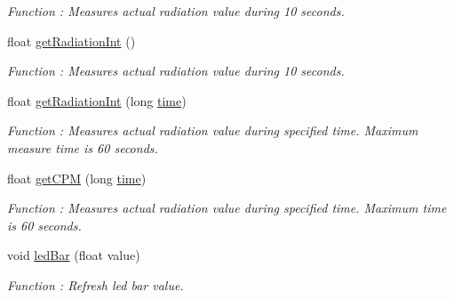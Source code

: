 \begin{DoxyCompactItemize}
\begin{DoxyCompactList}\small\item\em Function \+: Measures actual radiation value during 10 seconds. \end{DoxyCompactList}\item 
float \hyperlink{class_wasp_radiation_board_ad8a1047fbef9840174cd9566bdc8e3f5}{get\+Radiation\+Int} ()\hypertarget{class_wasp_radiation_board_ad8a1047fbef9840174cd9566bdc8e3f5}{}\label{class_wasp_radiation_board_ad8a1047fbef9840174cd9566bdc8e3f5}

\begin{DoxyCompactList}\small\item\em Function \+: Measures actual radiation value during 10 seconds. \end{DoxyCompactList}\item 
float \hyperlink{class_wasp_radiation_board_a1c9a6ed81fb0199c5fb9c2b1adfaa028}{get\+Radiation\+Int} (long \hyperlink{class_wasp_radiation_board_ac423dc8524f911b5e69b1dd1969ab3c0}{time})\hypertarget{class_wasp_radiation_board_a1c9a6ed81fb0199c5fb9c2b1adfaa028}{}\label{class_wasp_radiation_board_a1c9a6ed81fb0199c5fb9c2b1adfaa028}

\begin{DoxyCompactList}\small\item\em Function \+: Measures actual radiation value during specified time. Maximum measure time is 60 seconds. \end{DoxyCompactList}\item 
float \hyperlink{class_wasp_radiation_board_a3141cf5f06db0073296a6df9db3795ee}{get\+C\+PM} (long \hyperlink{class_wasp_radiation_board_ac423dc8524f911b5e69b1dd1969ab3c0}{time})\hypertarget{class_wasp_radiation_board_a3141cf5f06db0073296a6df9db3795ee}{}\label{class_wasp_radiation_board_a3141cf5f06db0073296a6df9db3795ee}

\begin{DoxyCompactList}\small\item\em Function \+: Measures actual radiation value during specified time. Maximum time is 60 seconds. \end{DoxyCompactList}\item 
void \hyperlink{class_wasp_radiation_board_a22cd28829fbd2c6a05b29456087257f2}{led\+Bar} (float value)\hypertarget{class_wasp_radiation_board_a22cd28829fbd2c6a05b29456087257f2}{}\label{class_wasp_radiation_board_a22cd28829fbd2c6a05b29456087257f2}

\begin{DoxyCompactList}\small\item\em Function \+: Refresh led bar value. \end{DoxyCompactList}\end{DoxyCompactItemize}
